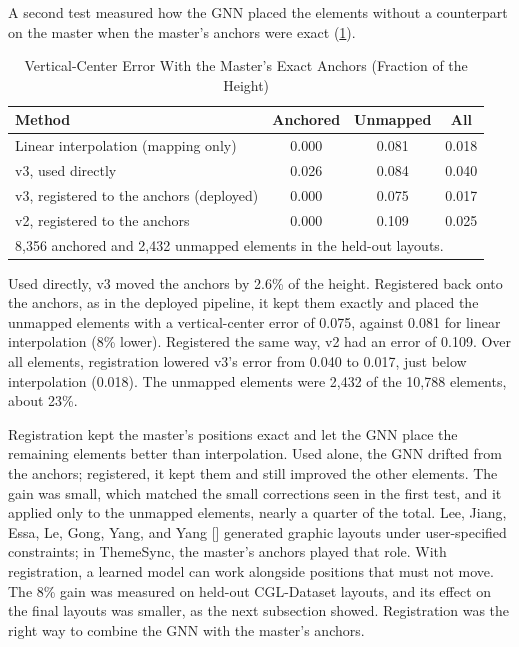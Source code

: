 \begin{refsection}
\clearpage
A second test measured how the GNN placed the elements without a counterpart on the master when the master's anchors were exact (\ref{tab:gnn-anchors}).

\begin{table}[!ht]
\centering
\caption{Vertical-Center Error With the Master's Exact Anchors (Fraction of the Height)}
\label{tab:gnn-anchors}
\begin{tabular}{l c c c}
\hline
\textbf{Method} & \textbf{Anchored} & \textbf{Unmapped} & \textbf{All} \\ \hline
Linear interpolation (mapping only) & 0.000 & 0.081 & 0.018 \\
v3, used directly & 0.026 & 0.084 & 0.040 \\
v3, registered to the anchors (deployed) & 0.000 & 0.075 & 0.017 \\
v2, registered to the anchors & 0.000 & 0.109 & 0.025 \\ \hline
\multicolumn{4}{p{0.80\textwidth}}{\footnotesize 8,356 anchored and 2,432 unmapped elements in the held-out layouts.}
\end{tabular}
\end{table}

Used directly, v3 moved the anchors by 2.6\% of the height. Registered back onto the anchors, as in the deployed pipeline, it kept them exactly and placed the unmapped elements with a vertical-center error of 0.075, against 0.081 for linear interpolation (8\% lower). Registered the same way, v2 had an error of 0.109. Over all elements, registration lowered v3's error from 0.040 to 0.017, just below interpolation (0.018). The unmapped elements were 2,432 of the 10,788 elements, about 23\%.

Registration kept the master's positions exact and let the GNN place the remaining elements better than interpolation. Used alone, the GNN drifted from the anchors; registered, it kept them and still improved the other elements. The gain was small, which matched the small corrections seen in the first test, and it applied only to the unmapped elements, nearly a quarter of the total. Lee, Jiang, Essa, Le, Gong, Yang, and Yang [\citeyear{Lee2020Neural}] generated graphic layouts under user-specified constraints; in ThemeSync, the master's anchors played that role. With registration, a learned model can work alongside positions that must not move. The 8\% gain was measured on held-out CGL-Dataset layouts, and its effect on the final layouts was smaller, as the next subsection showed. Registration was the right way to combine the GNN with the master's anchors.


\end{refsection}
